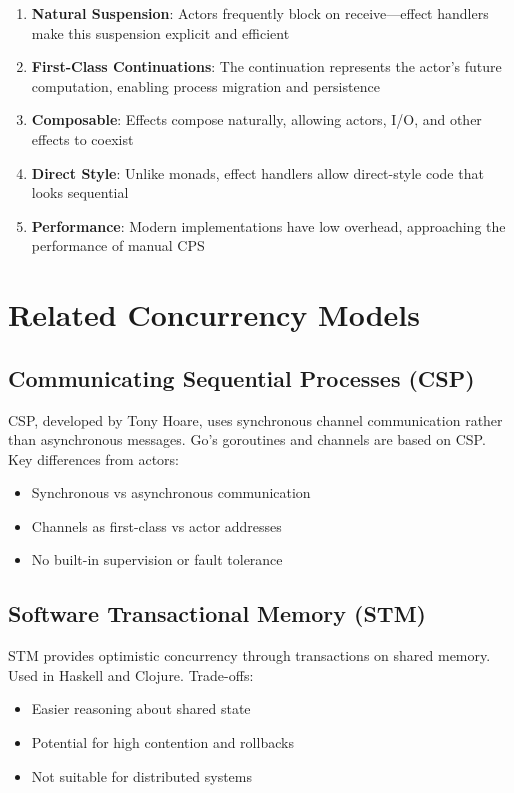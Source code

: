 \documentclass[12pt,a4paper]{report}
\begin{document}
\begin{enumerate}
\item \textbf{Natural Suspension}: Actors frequently block on receive—effect handlers make this suspension explicit and efficient

\item \textbf{First-Class Continuations}: The continuation represents the actor's future computation, enabling process migration and persistence

\item \textbf{Composable}: Effects compose naturally, allowing actors, I/O, and other effects to coexist

\item \textbf{Direct Style}: Unlike monads, effect handlers allow direct-style code that looks sequential

\item \textbf{Performance}: Modern implementations have low overhead, approaching the performance of manual CPS
\end{enumerate}

\section{Related Concurrency Models}

\subsection{Communicating Sequential Processes (CSP)}
CSP, developed by Tony Hoare, uses synchronous channel communication rather than asynchronous messages. Go's goroutines and channels are based on CSP. Key differences from actors:
\begin{itemize}
\item Synchronous vs asynchronous communication
\item Channels as first-class vs actor addresses
\item No built-in supervision or fault tolerance
\end{itemize}

\subsection{Software Transactional Memory (STM)}
STM provides optimistic concurrency through transactions on shared memory. Used in Haskell and Clojure. Trade-offs:
\begin{itemize}
\item Easier reasoning about shared state
\item Potential for high contention and rollbacks
\item Not suitable for distributed systems
\end{itemize}
\end{document}
